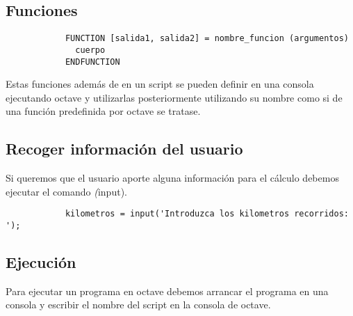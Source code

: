 \documentclass[a4,12pt,graphicx,caption,rotating]{article}
\begin{document}
\subsection{Funciones}
\begin{verbatim}
            FUNCTION [salida1, salida2] = nombre_funcion (argumentos)
              cuerpo
            ENDFUNCTION
\end{verbatim}

Estas funciones además de en un script se pueden definir en una consola ejecutando octave y utilizarlas posteriormente utilizando su nombre como si de una función predefinida por octave se tratase.
\subsection{Recoger información del usuario}
Si queremos que el usuario aporte alguna información para el cálculo debemos ejecutar el comando \emph(input).
\begin{verbatim}
            kilometros = input('Introduzca los kilometros recorridos: ');
\end{verbatim}
\subsection{Ejecución}
Para ejecutar un programa en octave debemos arrancar el programa en una consola y escribir el nombre del script en la consola de octave.
\end{document}

